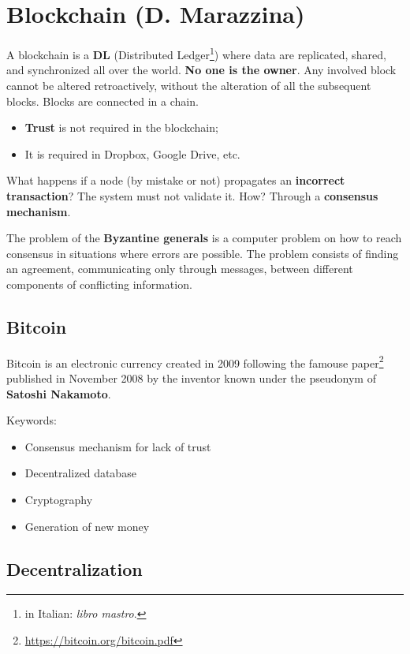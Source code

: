 
\chapter{Blockchain (D. Marazzina)}

A blockchain is a \textbf{DL} (Distributed Ledger\footnote{in Italian: \textit{libro mastro}.}) where data are replicated, shared, and synchronized all over the world. \textbf{No one is the owner}. Any involved block cannot be altered retroactively, without the alteration of all the subsequent blocks. Blocks are connected in a chain.
\begin{itemize}
    \item \textbf{Trust} is not required in the blockchain;
    \item It is required in Dropbox, Google Drive, etc.
\end{itemize}

What happens if a node (by mistake or not) propagates an \textbf{incorrect transaction}? The system must not validate it. How? Through a \textbf{consensus mechanism}.

The problem of the \textbf{Byzantine generals} is a computer problem on how to reach consensus in situations where errors are possible. The problem consists of finding an agreement, communicating only through messages, between different components of conflicting information.


\section{Bitcoin}

Bitcoin is an electronic currency created in 2009 following the famouse paper\footnote{\url{https://bitcoin.org/bitcoin.pdf}} published in November 2008 by the inventor known under the pseudonym of \textbf{Satoshi Nakamoto}.

Keywords:
\begin{itemize}
    \item Consensus mechanism for lack of trust
    \item Decentralized database
    \item Cryptography
    \item Generation of new money
\end{itemize}

\section{Decentralization}

